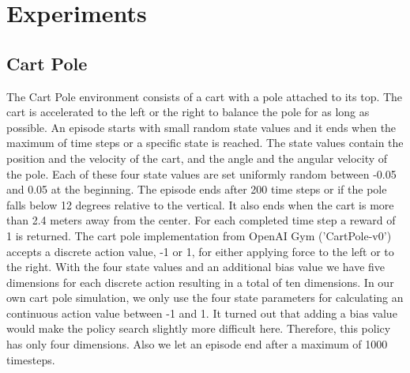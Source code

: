 \chapter{Experiments}
\label{chap:4}


\section{Cart Pole}



The Cart Pole environment consists of a cart with a pole attached to its top. The cart is accelerated to the left or the right to balance the pole for as long as possible. An episode starts with small random state values and it ends when the maximum of time steps or a specific state is reached. The state values contain the position and the velocity of the cart, and the angle and the angular velocity of the pole. Each of these four state values are set uniformly random between -0.05 and 0.05 at the beginning. The episode ends after 200 time steps or if the pole falls below 12 degrees relative to the vertical. It also ends when the cart is more than 2.4 meters away from the center. For each completed time step a reward of 1 is returned. The cart pole implementation from OpenAI Gym ('CartPole-v0') accepts a discrete action value, -1 or 1, for either applying force to the left or to the right. With the four state values and an additional bias value we have five dimensions for each discrete action resulting in a total of ten dimensions. In our own cart pole simulation, we only use the four state parameters for calculating an continuous action value between -1 and 1. It turned out that adding a bias value would make the policy search slightly more difficult here. Therefore, this policy has only four dimensions. Also we let an episode end after a maximum of 1000 timesteps.


